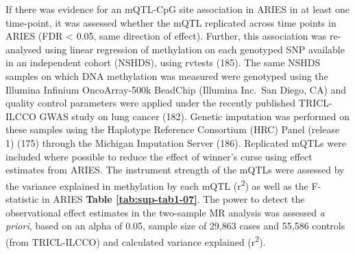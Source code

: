 \documentclass[11pt,oneside]{bristolthesis}
\begin{document}
If there was evidence for an mQTL-CpG site association in ARIES in at least one time-point, it was assessed whether the mQTL replicated across time points in ARIES (FDR \textless{} 0.05, same direction of effect). Further, this association was re-analysed using linear regression of methylation on each genotyped SNP available in an independent cohort (NSHDS), using rvtests (185). The same NSHDS samples on which DNA methylation was measured were genotyped using the Illumina Infinium OncoArray-500k BeadChip (Illumina Inc.~San Diego, CA) and quality control parameters were applied under the recently published TRICL-ILCCO GWAS study on lung cancer (182). Genetic imputation was performed on these samples using the Haplotype Reference Consortium (HRC) Panel (release 1) (175) through the Michigan Imputation Server (186). Replicated mQTLs were included where possible to reduce the effect of winner's curse using effect estimates from ARIES. The instrument strength of the mQTLs were assessed by the variance explained in methylation by each mQTL (r\textsuperscript{2}) as well as the F-statistic in ARIES \textbf{Table \ref{tab:sup-tab1-07}}. The power to detect the observational effect estimates in the two-sample MR analysis was assessed \emph{a priori}, based on an alpha of 0.05, sample size of 29,863 cases and 55,586 controls (from TRICL-ILCCO) and calculated variance explained (r\textsuperscript{2}). \linebreak
\end{document}
